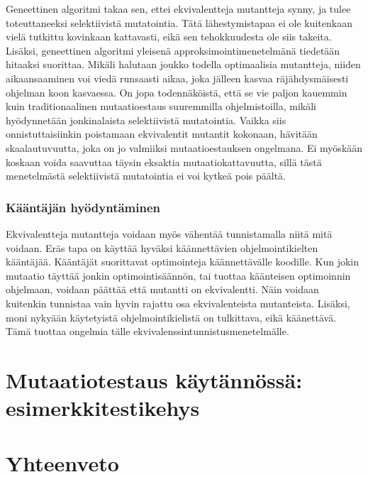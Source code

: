 \documentclass{tktltiki}
\begin{document}
Geneettinen algoritmi takaa sen, ettei ekvivalentteja mutantteja synny, ja tulee toteuttaneeksi selektiivistä mutatointia. Tätä lähestymistapaa ei ole kuitenkaan vielä tutkittu kovinkaan kattavasti, eikä sen tehokkuudesta ole siis takeita. Lisäksi, geneettinen algoritmi yleisenä approksimointimenetelmänä tiedetään hitaaksi suorittaa. Mikäli halutaan joukko todella optimaalisia mutantteja, niiden aikaansaaminen voi viedä runsaasti aikaa, joka jälleen kasvaa räjähdysmäisesti ohjelman koon kasvaessa. On jopa todennäköistä, että se vie paljon kauemmin kuin traditionaalinen mutaatioestaus suuremmilla ohjelmistoilla, mikäli hyödynnetään jonkinalaista selektiivistä mutatointia. Vaikka siis onnistuttaisiinkin poistamaan ekvivalentit mutantit kokonaan, hävitään skaalautuvuutta, joka on jo valmiiksi mutaatioestauksen ongelmana. Ei myöskään koskaan voida saavuttaa täysin eksaktia mutaatiokattavuutta, sillä tästä menetelmästä selektiivistä mutatointia ei voi kytkeä pois päältä.

\subsubsection{Kääntäjän hyödyntäminen}
Ekvivalentteja mutantteja voidaan myös vähentää tunnistamalla niitä mitä voidaan. Eräs tapa on käyttää hyväksi käännettävien ohjelmointikielten kääntäjää. Kääntäjät suorittavat optimointeja käännettävälle koodille. Kun jokin mutaatio täyttää jonkin optimointisäännön, tai tuottaa käänteisen optimoinnin ohjelmaan, voidaan päättää että mutantti on ekvivalentti. Näin voidaan kuitenkin tunnistaa vain hyvin rajattu osa ekvivalenteista mutanteista. Lisäksi, moni nykyään käytetyistä ohjelmointikielistä on tulkittava, eikä käänettävä. Tämä tuottaa ongelmia tälle ekvivalenssintunnistusmenetelmälle. 

\section{Mutaatiotestaus käytännössä: esimerkkitestikehys}


\section{Yhteenveto}
\end{document}
